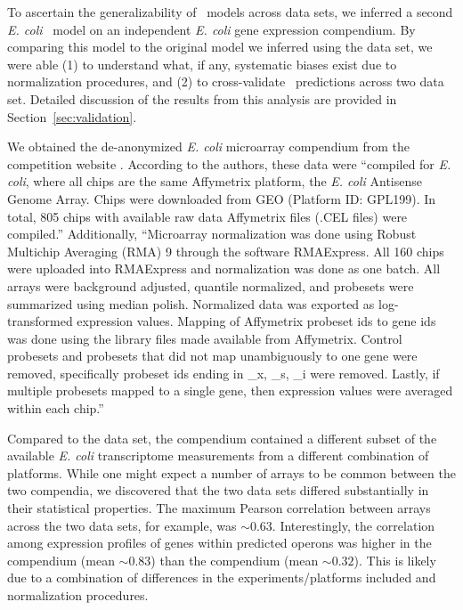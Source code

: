 To ascertain the generalizability of \egrine~models across data sets, we inferred a second \textit{E. coli} \egrine~model on an independent \textit{E. coli} gene expression compendium. By comparing this model to the original model we inferred using the  data set, we were able (1) to  understand what, if any, systematic biases exist due to normalization procedures, and (2) to cross-validate \egrine~predictions across two data set. Detailed discussion of the results from this analysis are provided in Section~\ref{sec:validation}.

We obtained the de-anonymized {\it E. coli} microarray compendium from the  competition website \cite{Marbach2012}. According to the authors, these data were ``compiled for {\it E. coli}, where all chips are the same
Affymetrix platform, the \textit{E. coli} Antisense Genome Array. Chips were
downloaded from GEO (Platform ID: GPL199). In total, 805 chips with
available raw data Affymetrix files (.CEL files) were compiled.''
Additionally, ``Microarray normalization was done using Robust
Multichip Averaging (RMA) 9 through the software RMAExpress. All 160
chips were uploaded into RMAExpress and normalization was done as one
batch. All arrays were background adjusted, quantile normalized, and
probesets were summarized using median polish. Normalized data was
exported as log-transformed expression values. Mapping of Affymetrix
probeset ids to gene ids was done using the library files made
available from Affymetrix. Control probesets and probesets that did
not map unambiguously to one gene were removed, specifically probeset
ids ending in \_x, \_s, \_i were removed. Lastly, if multiple
probesets mapped to a single gene, then expression values were
averaged within each chip.''

Compared to the  \cite{Lemmens2009a} data set, the  \cite{Marbach2012}
compendium contained a different subset of the available \textit{E. coli} transcriptome measurements from a different combination of platforms. While one might expect a number of arrays to be common between the two compendia, we discovered that the two data sets differed substantially in their statistical properties. The maximum Pearson correlation between arrays across the two data sets, for example, was $\sim 0.63$.  Interestingly, the correlation among expression profiles of
genes within predicted operons \cite{Price2005a} was higher in the
 compendium (mean $\sim 0.83$) than the  compendium
(mean $\sim 0.32$). This is likely due to a combination of differences in the experiments/platforms included and normalization procedures. 
